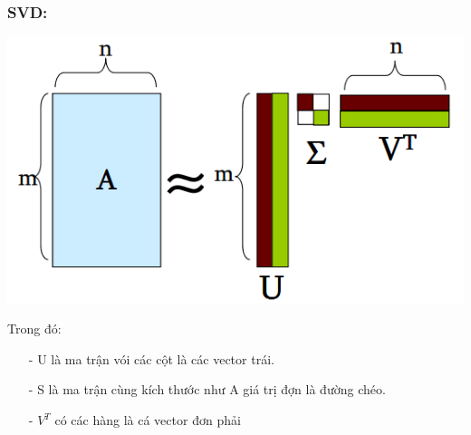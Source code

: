 \documentclass[a0,portrait,11pt]{a0poster}
\begin{document}
\begin{multicols}{2}
\begin{mybox}
\subsubsection*{SVD:}
\begin{minipage}[c]{0.5\linewidth}
\includegraphics[width=18cm]{svd.png}
\end{minipage}
\begin{minipage}[c]{0.4\linewidth}
Trong đó:
\begin{itemize}
\item[-] U là ma trận vói các cột là các vector trái.
\item[-] S là ma trận cùng kích thước như A giá trị đợn là đường chéo.
\item[-] $V^T$ có các hàng là cá vector đơn phải 
\end{itemize}
\end{minipage}

\end{mybox}
\end{multicols}
\end{document}
